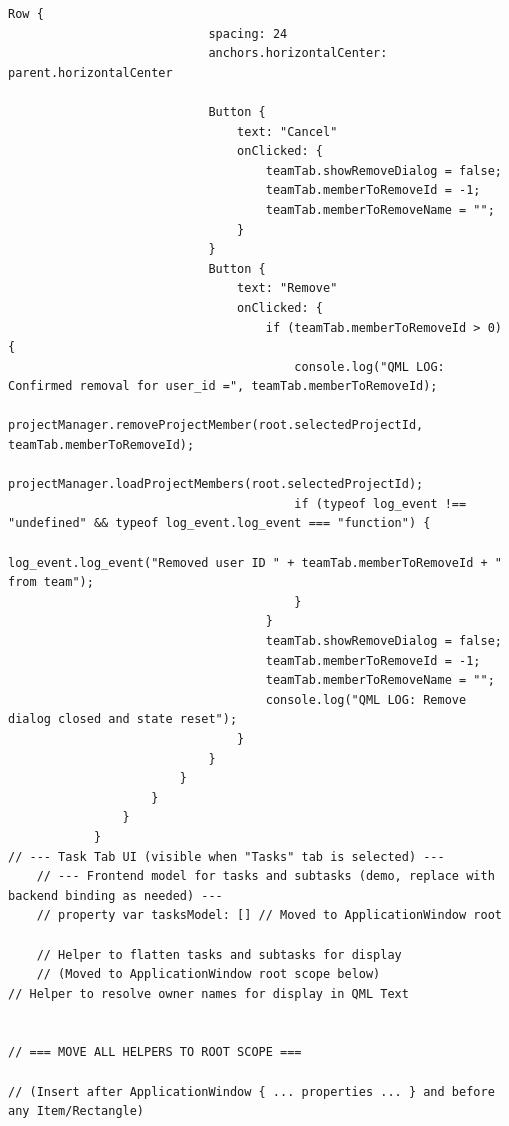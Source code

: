 \documentclass{report}
\begin{document}
\begin{lstlisting}[style=qmlstyle]
                        Row {
                            spacing: 24
                            anchors.horizontalCenter: parent.horizontalCenter

                            Button {
                                text: "Cancel"
                                onClicked: {
                                    teamTab.showRemoveDialog = false;
                                    teamTab.memberToRemoveId = -1;
                                    teamTab.memberToRemoveName = "";
                                }
                            }
                            Button {
                                text: "Remove"
                                onClicked: {
                                    if (teamTab.memberToRemoveId > 0) {
                                        console.log("QML LOG: Confirmed removal for user_id =", teamTab.memberToRemoveId);
                                        projectManager.removeProjectMember(root.selectedProjectId, teamTab.memberToRemoveId);
                                        projectManager.loadProjectMembers(root.selectedProjectId);
                                        if (typeof log_event !== "undefined" && typeof log_event.log_event === "function") {
                                            log_event.log_event("Removed user ID " + teamTab.memberToRemoveId + " from team");
                                        }
                                    }
                                    teamTab.showRemoveDialog = false;
                                    teamTab.memberToRemoveId = -1;
                                    teamTab.memberToRemoveName = "";
                                    console.log("QML LOG: Remove dialog closed and state reset");
                                }
                            }
                        }
                    }
                }
            }
// --- Task Tab UI (visible when "Tasks" tab is selected) ---
    // --- Frontend model for tasks and subtasks (demo, replace with backend binding as needed) ---
    // property var tasksModel: [] // Moved to ApplicationWindow root

    // Helper to flatten tasks and subtasks for display
    // (Moved to ApplicationWindow root scope below)
// Helper to resolve owner names for display in QML Text


// === MOVE ALL HELPERS TO ROOT SCOPE ===

// (Insert after ApplicationWindow { ... properties ... } and before any Item/Rectangle)


\end{lstlisting}
\end{document}
